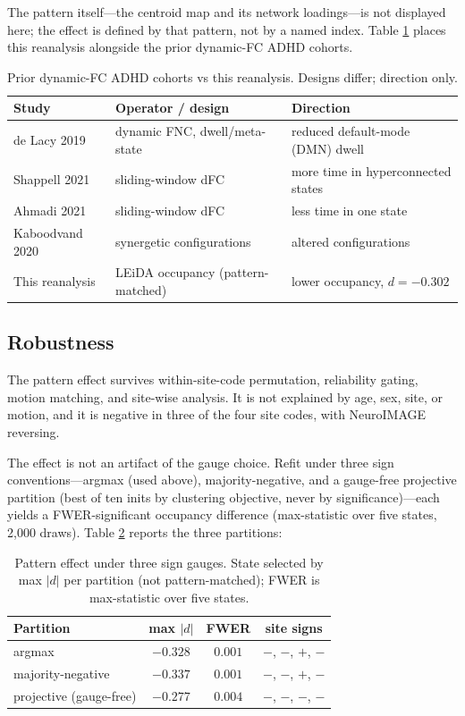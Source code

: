 \documentclass[11pt]{article}
\theoremstyle{definition}
\begin{document}
The pattern itself---the centroid map and its network loadings---is not displayed
here; the effect is defined by that pattern, not by a named index. Table \ref{tab:prior}
places this reanalysis alongside the prior dynamic-FC ADHD cohorts.

\begin{table}[H]
\centering
\caption{Prior dynamic-FC ADHD cohorts vs this reanalysis. Designs differ; direction only.}
\begin{tabular}{lll}
\toprule
Study & Operator / design & Direction \\
\midrule
de Lacy 2019 & dynamic FNC, dwell/meta-state & reduced default-mode (DMN) dwell \\
Shappell 2021 & sliding-window dFC & more time in hyperconnected states \\
Ahmadi 2021 & sliding-window dFC & less time in one state \\
Kaboodvand 2020 & synergetic configurations & altered configurations \\
This reanalysis & LEiDA occupancy (pattern-matched) & lower occupancy, $d=-0.302$ \\
\bottomrule
\end{tabular}
\label{tab:prior}
\end{table}

\subsection{Robustness}
The pattern effect survives within-site-code permutation, reliability gating, motion
matching, and site-wise analysis. It is not explained by age, sex, site, or motion, and
it is negative in three of the four site codes, with NeuroIMAGE reversing.

The effect is not an artifact of the gauge choice. Refit under three sign
conventions---argmax (used above), majority-negative, and a gauge-free projective
partition (best of ten inits by clustering objective, never by significance)---each
yields a FWER-significant occupancy difference (max-statistic over five states, 2,000
draws). Table \ref{tab:gauge} reports the three partitions:

\begin{table}[H]
\centering
\caption{Pattern effect under three sign gauges. State selected by max $|d|$ per
partition (not pattern-matched); FWER is max-statistic over five states.}
\begin{tabular}{lccc}
\toprule
Partition & max $|d|$ & FWER & site signs \\
\midrule
argmax & $-0.328$ & $0.001$ & $-$, $-$, $+$, $-$ \\
majority-negative & $-0.337$ & $0.001$ & $-$, $-$, $+$, $-$ \\
projective (gauge-free) & $-0.277$ & $0.004$ & $-$, $-$, $-$, $-$ \\
\bottomrule
\end{tabular}
\label{tab:gauge}
\end{table}
\end{document}
